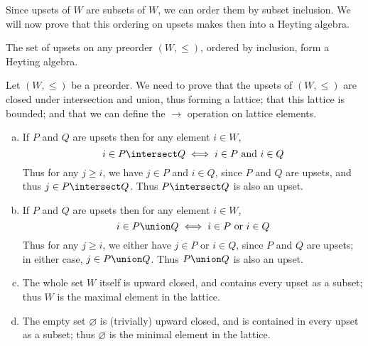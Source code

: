 Since upsets of $W$ are subsets of $W$, we can order them by subset inclusion.  We will now prove that this ordering on upsets makes then into a Heyting algebra.

\begin{Theorem}
The set of upsets on any preorder $(W, \leq)$, ordered by inclusion, form a Heyting algebra.
\end{Theorem}
\begin{Proof}
Let $(W, \leq)$ be a preorder.  We need to prove that the upsets of $(W, \leq)$ are closed under intersection and union, thus forming a lattice; that this lattice is bounded; and that we can define the $\to$ operation on lattice elements.  %
\begin{enumerate}[(a)]
\item If $P$ and $Q$ are upsets then for any element $i \in W$, 
\[
i \in P \intersect Q 
\iff
i \in P \mbox{ and } i \in Q
\]
Thus for any $j \geq i$, we have $j \in P$ and $i \in Q$, since $P$ and $Q$ are upsets, and thus $j \in P \intersect Q$.  Thus $P \intersect Q$ is also an upset.

\item If $P$ and $Q$ are upsets then for any element $i \in W$, 
\[
i \in P \union Q 
\iff
i \in P \mbox{ or } i \in Q
\]
Thus for any $j \geq i$, we either have $j \in P$ or $i \in Q$, since $P$ and $Q$ are upsets; in either case, $j \in P \union Q$.  Thus $P \union Q$ is also an upset.

\item The whole set $W$ itself is upward closed, and contains every upset as a subset; thus $W$ is the maximal element in the lattice.

\item The empty set $\varnothing$ is (trivially) upward closed, and is contained in every upset as a subset; thus $\varnothing$ is the minimal element in the lattice.


\end{enumerate}
\end{Proof}
